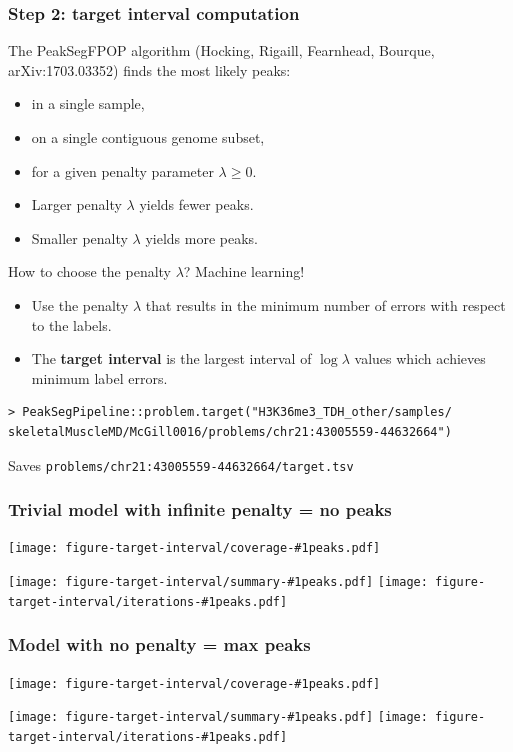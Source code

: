 \documentclass{beamer}
\begin{document}
\begin{frame}[fragile]
  \frametitle{Step 2: target interval computation}
  The PeakSegFPOP algorithm (Hocking, Rigaill, Fearnhead, Bourque,
  arXiv:1703.03352) finds the most likely peaks:
  \begin{itemize}
  \item in a single sample, 
  \item on a single contiguous genome subset,
  \item for a given penalty parameter $\lambda\geq 0$.
  \item Larger penalty $\lambda$ yields fewer peaks.
  \item Smaller penalty $\lambda$ yields more peaks.
  \end{itemize}
  How to choose the penalty $\lambda$? Machine learning!
  \begin{itemize}
  \item Use the penalty $\lambda$ that results in the minimum
    number of errors with respect to the labels.
  \item The \textbf{target interval} is the largest interval of
    $\log\lambda$ values which achieves minimum label errors.
  \end{itemize}
\small
\begin{verbatim}
> PeakSegPipeline::problem.target("H3K36me3_TDH_other/samples/
skeletalMuscleMD/McGill0016/problems/chr21:43005559-44632664")
\end{verbatim}
Saves \verb|problems/chr21:43005559-44632664/target.tsv|
\end{frame}


\newcommand{\showboth}[1]{
  \texttt{[image: figure-target-interval/coverage-\#1peaks.pdf]}

  \texttt{[image: figure-target-interval/summary-\#1peaks.pdf]}
  \texttt{[image: figure-target-interval/iterations-\#1peaks.pdf]}
} 

\begin{frame}
  \frametitle{Trivial model with infinite penalty = no peaks}
  \showboth{0}
\end{frame}

\begin{frame}
  \frametitle{Model with no penalty = max peaks}
  \showboth{711188}%
\end{frame}
\end{document}
